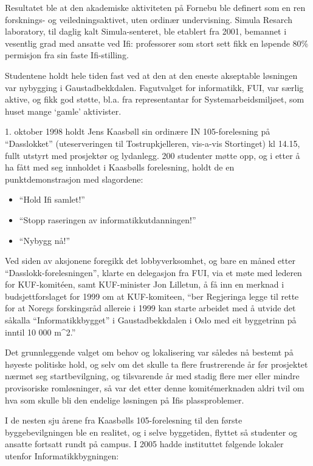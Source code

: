 Resultatet ble at den akademiske aktiviteten på Fornebu ble definert som en ren forsknings- og veiledningsaktivet, uten ordinær undervisning. Simula Resarch laboratory, til daglig kalt Simula-senteret, ble etablert fra 2001, bemannet i vesentlig grad med ansatte ved Ifi: professorer som stort sett fikk en løpende 80\% permisjon fra sin faste Ifi-stilling.

Studentene holdt hele tiden fast ved at den at den eneste akseptable løsningen var nybygging i Gaustadbekkdalen. Fagutvalget for informatikk, FUI, var særlig aktive, og fikk god støtte, bl.a. fra representantar for Systemarbeidsmiljøet, som huset mange `gamle' aktivister.

1. oktober 1998 holdt Jens Kaasbøll sin ordinære IN 105-forelesning på ``Dasslokket'' (uteserveringen til Tostrupkjelleren, vis-a-vis Stortinget) kl 14.15, fullt utstyrt med prosjektør og lydanlegg. 200 studenter møtte opp, og i etter å ha fått med seg innholdet i Kaasbølls forelesning, holdt de en punktdemonstrasjon med slagordene:

\begin{itemize}
	\item ``Hold Ifi samlet!''
	\item ``Stopp raseringen av informatikkutdanningen!''
	\item ``Nybygg nå!''
\end{itemize}

Ved siden av aksjonene foregikk det lobbyverksomhet, og bare en måned etter ``Dasslokk-forelesningen'', klarte en delegasjon fra FUI, via et møte med lederen for KUF-komitéen, samt KUF-minister Jon Lilletun, å få inn en merknad i budsjettforslaget for 1999 om at KUF-komiteen, ``ber Regjeringa legge til rette for at Noregs forskingsråd allereie i 1999 kan starte arbeidet med å utvide det såkalla ``Informatikkbygget'' i Gaustadbekkdalen i Oslo med eit byggetrinn på inntil 10 000 m^{2}.''

Det grunnleggende valget om behov og lokalisering var således nå bestemt på høyeste politiske hold, og selv om det skulle ta flere frustrerende år før prosjektet nærmet seg startbevilgning, og tilsvarende år med stadig flere mer eller mindre provisoriske romløsninger, så var det etter denne komitémerknaden aldri tvil om hva som skulle bli den endelige løsningen på Ifis plassproblemer.

I de nesten sju årene fra Kaasbølls 105-forelesning til den første byggebevilgningen ble en realitet, og i selve byggetiden, flyttet så studenter og ansatte fortsatt rundt på campus. I 2005 hadde instituttet følgende lokaler utenfor Informatikkbygningen:

